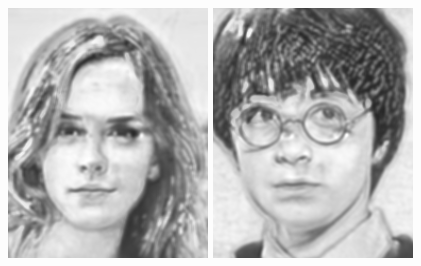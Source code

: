 \documentclass[10pt,twocolumn,letterpaper]{article}
\begin{document}
\begin{figure}[htbp]
{\begin{minipage}[b]{0.22\linewidth}
\includegraphics[width=0.99\linewidth]{img/real_world_photos/bfcn_r3.png}
\includegraphics[width=0.99\linewidth]{img/real_world_photos/bfcn_r4.png}

\end{minipage}}
\end{figure}
\end{document}
